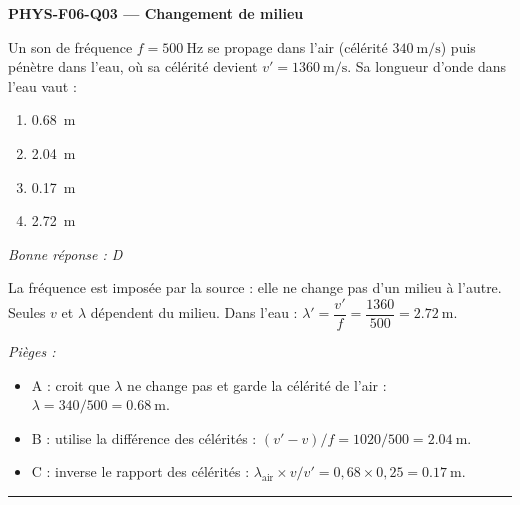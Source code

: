 \documentclass[11pt,a4paper]{article}
\begin{document}
\noindent\textbf{PHYS-F06-Q03 --- Changement de milieu}\par
Un son de fréquence $f = \qty{500}{\hertz}$ se propage dans l'air (célérité $\qty{340}{\metre\per\second}$) puis pénètre dans l'eau, où sa célérité devient $v' = \qty{1360}{\metre\per\second}$. Sa longueur d'onde dans l'eau vaut :
\begin{enumerate}[label=\Alph*)]
\item \qty{0.68}{\metre}
\item \qty{2.04}{\metre}
\item \qty{0.17}{\metre}
\item \qty{2.72}{\metre}
\end{enumerate}
\textit{Bonne réponse : D}\par
La fréquence est imposée par la source : elle ne change pas d'un milieu à l'autre. Seules $v$ et $\lambda$ dépendent du milieu. Dans l'eau : $\lambda' = \dfrac{v'}{f} = \dfrac{1360}{500} = \qty{2.72}{\metre}$.\par
\textit{Pièges :}
\begin{itemize}
\item A : croit que $\lambda$ ne change pas et garde la célérité de l'air : $\lambda = 340/500 = \qty{0.68}{\metre}$.
\item B : utilise la différence des célérités : $(v'-v)/f = 1020/500 = \qty{2.04}{\metre}$.
\item C : inverse le rapport des célérités : $\lambda_{\text{air}}\times v/v' = 0{,}68\times0{,}25 = \qty{0.17}{\metre}$.
\end{itemize}
\vspace{8pt}\hrule\vspace{8pt}
\end{document}
